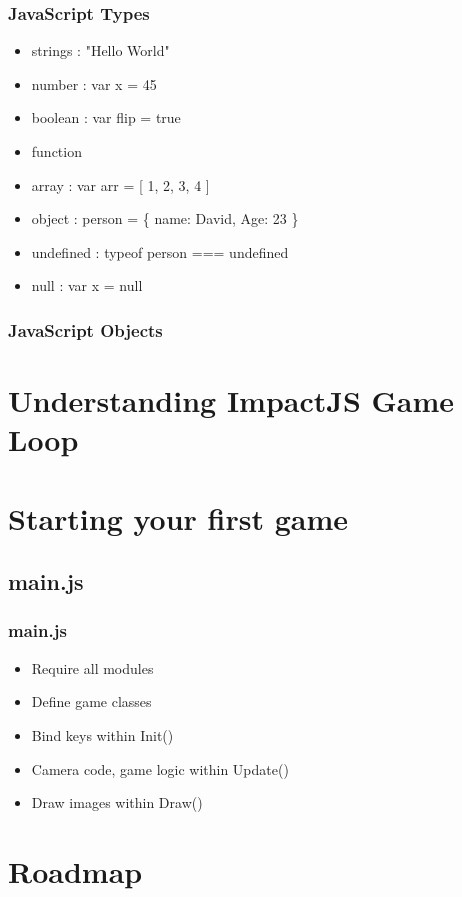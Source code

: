 \documentclass[red]{beamer}
\begin{document}
\begin{frame}
	\frametitle{JavaScript Types}
	 \begin{itemize}
  		\item<1-> strings : "Hello World"
 		\item<2-> number : var x = 45
 		\item<3-> boolean : var flip = true
		\item<4-> function
		\item<5-> array : var arr = [ 1, 2, 3, 4 ]
		\item<6->object : person = \{ name: David, Age: 23 \}
		\item<7->undefined : typeof person === undefined
		\item<8->null : var x = null
 	 \end{itemize}
\end{frame}

\begin{frame}
 	\frametitle{JavaScript Objects}
		\lstI
\end{frame}

\section{Understanding ImpactJS Game Loop}


\section{Starting your first game}
\subsection{main.js}
\begin{frame}
    \frametitle{main.js}
    \begin{itemize}
        \item<1-> Require all modules
        \item<2-> Define game classes
        \item<3-> Bind keys within Init()
        \item<4-> Camera code, game logic within Update()
        \item<5-> Draw images within Draw()
    \end{itemize}
\end{frame}

\section{Roadmap}
\end{document}
